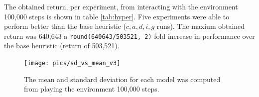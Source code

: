 \documentclass[
  openany]{book}
\begin{document}
The obtained return, per experiment, from interacting with the environment 100,000 steps is shown in table \ref{tab:hyper}. Five experiments were able to perform better than the base heuristic (\(c,a,d,i,g\) runs). The maxium obtained return was 640,643 a \texttt{round(640643/503521,\ 2)} fold increase in performance over the base heuristic (return of 503,521).

\begin{table}

\caption{\label{tab:hyper}Comparision of obtained returns from the nine runs. The return was computed from playing 100,000 steps per run following the learned policy. The runs are ordered from best to worst and are named from $a$ to $i$, the "heuristic" and "random" baselines are marked as "H" and "R" respectively.}
\centering
{}
\end{table}



\begin{figure}

{\centering \texttt{[image: pics/sd\_vs\_mean\_v3]} 

}

\caption{The mean and standard deviation for each model was computed from playing the environment 100,000 steps.}\label{fig:sd-vs-mean}
\end{figure}
\end{document}
